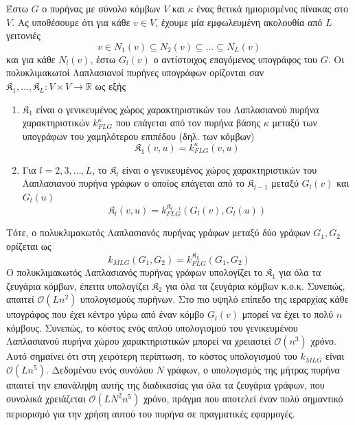 Έστω $G$ ο πυρήνας με σύνολο κόμβων $V$ και $\kappa$ ένας θετικά ημιορισμένος πίνακας στο $V$.
Ας υποθέσουμε ότι για κάθε $v \in V$, έχουμε μία εμφωλευμένη ακολουθία από $L$ γειτονιές
\begin{equation}
    v \in N_1(v) \subseteq N_2(v) \subseteq \ldots \subseteq N_L(v)
\end{equation}
και για κάθε $N_l(v)$, έστω $G_l(v)$ ο αντίστοιχος επαγόμενος υπογράφος του $G$.
Οι πολυκλιμακωτοί Λαπλασιανοί πυρήνες υπογράφων ορίζονται σαν $\mathfrak{K}_1, \ldots, \mathfrak{K}_L : V \times V \rightarrow \mathbb{R}$ ως εξής
\begin{enumerate}
    \item $\mathfrak{K}_1$ είναι ο γενικευμένος χώρος χαρακτηριστικών του Λαπλασιανού πυρήνα χαρακτηριστικών $k_{FLG}^\kappa$ που επάγεται από τον πυρήνα βάσης $\kappa$ μεταξύ των υπογράφων του χαμηλότερου επιπέδου (δηλ. των κόμβων)
    \begin{equation}
        \mathfrak{K}_1(v,u) = k_{FLG}^\kappa(v, u)
    \end{equation}
    \item Για $l=2,3,\ldots,L$, το $\mathfrak{K}_l$ είναι ο γενικευμένος χώρος χαρακτηριστικών  του Λαπλασιανού πυρήνα γράφων ο οποίος επάγεται από το  $\mathfrak{K}_{l-1}$ μεταξύ  $G_l(v)$ και $G_l(u)$
    \begin{equation}
        \mathfrak{K}_l(v,u) = k_{FLG}^{\mathfrak{K}_{l-1}}(G_l(v), G_l(u))
    \end{equation}
\end{enumerate}
Τότε, ο πολυκλιμακωτός Λαπλασιανός πυρήνας γράφων μεταξύ δύο γράφων $G_1, G_2$ ορίζεται ως
\begin{equation*}
    k_{MLG}(G_1, G_2) = k_{FLG}^{\mathfrak{K}_L}(G_1, G_2)
\end{equation*}
Ο πολυκλιμακωτός Λαπλασιανός πυρήνας γράφων υπολογίζει το $\mathfrak{K}_1$ για όλα τα ζευγάρια κόμβων, έπειτα υπολογίζει $\mathfrak{K}_2$ για όλα τα ζευγάρια κόμβων κ.ο.κ.
Συνεπώς, απαιτεί $\mathcal{O}(Ln^2)$ υπολογισμούς πυρήνων.
Στο πιο υψηλό επίπεδο της ιεραρχίας κάθε υπογράφος που έχει κέντρο γύρω από έναν κόμβο $G_l(v)$ μπορεί να έχει το πολύ $n$ κόμβους.
Συνεπώς, το κόστος ενός απλού υπολογισμού του γενικευμένου Λαπλασιανού πυρήνα χώρου χαρακτηριστικών μπορεί να χρειαστεί $\mathcal{O}(n^3)$ χρόνο.
Αυτό σημαίνει ότι στη χειρότερη περίπτωση, το κόστος υπολογισμού του $k_{MLG}$ είναι $\mathcal{O}(Ln^5)$.
Δεδομένου ενός συνόλου $N$ γράφων, ο υπολογισμός της μήτρας πυρήνα απαιτεί την επανάληψη αυτής της διαδικασίας για όλα τα ζευγάρια γράφων, που συνολικά χρειάζεται $\mathcal{O}(LN^2n^5)$ χρόνο, πράγμα που αποτελεί έναν πολύ σημαντικό περιορισμό για την χρήση αυτού του πυρήνα σε πραγματικές εφαρμογές.\par
